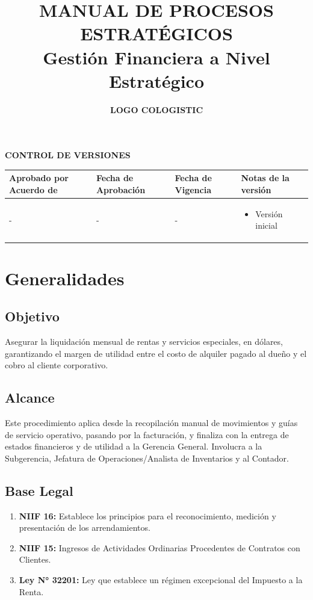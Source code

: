 \documentclass[11pt,letterpaper]{report}
\title{\textbf{\large MANUAL DE PROCESOS ESTRATÉGICOS}\\[0.5em] \textbf{\Huge Gestión Financiera a Nivel Estratégico}}
\author{\textbf{LOGO COLOGISTIC}}
\date{}
\begin{document}
\maketitle

\begin{center}
\textbf{\large CONTROL DE VERSIONES}
\end{center}
\begin{tabularx}{\textwidth}{p{}p{}p{}X}
\toprule
\textbf{Aprobado por Acuerdo de} & \textbf{Fecha de Aprobación} & \textbf{Fecha de Vigencia} & \textbf{Notas de la versión} \\
\midrule
- & - & - & \begin{itemize} \item Versión inicial \end{itemize} \\
\bottomrule
\end{tabularx}

\newpage

\tableofcontents

\newpage

\chapter{Generalidades}

\section{Objetivo}
Asegurar la liquidación mensual de rentas y servicios especiales, en dólares, garantizando el margen de utilidad entre el costo de alquiler pagado al dueño y el cobro al cliente corporativo.

\section{Alcance}
Este procedimiento aplica desde la recopilación manual de movimientos y guías de servicio operativo, pasando por la facturación, y finaliza con la entrega de estados financieros y de utilidad a la Gerencia General. Involucra a la Subgerencia, Jefatura de Operaciones/Analista de Inventarios y al Contador.

\section{Base Legal}
\begin{enumerate}
  \item \textbf{NIIF 16:} Establece los principios para el reconocimiento, medición y presentación de los arrendamientos.
  \item \textbf{NIIF 15:} Ingresos de Actividades Ordinarias Procedentes de Contratos con Clientes.
  \item \textbf{Ley N° 32201:} Ley que establece un régimen excepcional del Impuesto a la Renta.
\end{enumerate}
\end{document}

